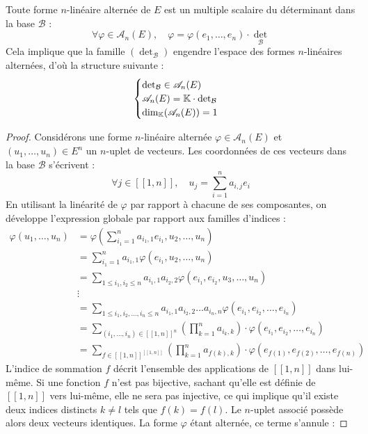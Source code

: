 \documentclass[12pt, a4paper]{report}
\begin{document}
\begin{property}
    Toute forme $n$-linéaire alternée de $E$ est un multiple scalaire du déterminant dans la base $\mathcal{B}$ :
    $$\forall \varphi \in \mathscr A_n(E), \quad \varphi = \varphi(e_1, \dots, e_n) \cdot \det_{\mathcal{B}}$$
    Cela implique que la famille $(\det_\mathcal{B})$ engendre l'espace des formes $n$-linéaires alternées, d'où la structure suivante :
    $$\begin{cases}
    \det_{\mathcal{B}} \in \mathscr A_n(E) \\
    \mathscr A_n(E) = \mathbb{K} \cdot \det_{\mathcal{B}} \\
    \dim_{\mathbb{K}}(\mathscr A_n(E)) = 1
    \end{cases}$$
\end{property}

\begin{proof}
    Considérons une forme $n$-linéaire alternée $\varphi \in \mathscr A_n(E)$ et $(u_1, \dots, u_n) \in E^n$ un $n$-uplet de vecteurs. Les coordonnées de ces vecteurs dans la base $\mathcal{B}$ s'écrivent :
    $$\forall j \in [\![1,n]\!], \quad u_j = \sum_{i=1}^n a_{i,j} e_i$$
    En utilisant la linéarité de $\varphi$ par rapport à chacune de ses composantes, on développe l'expression globale par rapport aux familles d'indices :
    \begin{align*}
        \varphi(u_1,\dots,u_n) &= \varphi\left(\sum_{i_1=1}^n a_{i_1,1} e_{i_1}, u_2, \dots, u_n\right) \\
        &= \sum_{i_1=1}^n a_{i_1,1} \varphi(e_{i_1}, u_2, \dots, u_n) \\
        &= \sum_{1 \le i_1, i_2 \le n} a_{i_1,1} a_{i_2,2} \varphi(e_{i_1}, e_{i_2}, u_3, \dots, u_n) \\
        &\vdots \\
        &= \sum_{1 \le i_1, i_2, \dots, i_n \le n} a_{i_1,1} a_{i_2,2} \dots a_{i_n,n} \varphi(e_{i_1}, e_{i_2}, \dots, e_{i_n}) \\
        &= \sum_{(i_1,\dots,i_n) \in [\![1,n]\!]^n} \left(\prod_{k=1}^n a_{i_k,k}\right) \cdot \varphi(e_{i_1}, e_{i_2}, \dots, e_{i_n}) \\
        &= \sum_{f \in [\![1,n]\!]^{[\![1,n]\!]}} \left(\prod_{k=1}^n a_{f(k),k}\right) \cdot \varphi(e_{f(1)}, e_{f(2)}, \dots, e_{f(n)})
    \end{align*}
    L'indice de sommation $f$ décrit l'ensemble des applications de $[\![1,n]\!]$ dans lui-même. Si une fonction $f$ n'est pas bijective, sachant qu'elle est définie de $[\![1,n]\!]$ vers lui-même, elle ne sera pas injective, ce qui implique qu'il existe deux indices distincts $k \ne l$ tels que $f(k) = f(l)$. Le $n$-uplet associé possède alors deux vecteurs identiques. La forme $\varphi$ étant alternée, ce terme s'annule :

\end{proof}
\end{document}
